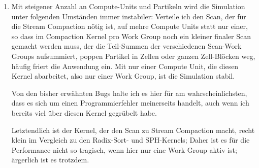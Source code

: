\begin{enumerate}
		\item 
		\label{enum:oclSyncBug}		
		Mit steigener Anzahl an Compute-Units und Partikeln wird die Simulation unter folgenden Umständen immer instabiler:
		Verteile ich den Scan, der für die Stream Compaction nötig ist, auf mehre Compute Units statt nur einer,
		so dass im Compaction Kernel pro Work Group noch ein kleiner finaler Scan gemacht werden muss,
		der die Teil-Summen der verschiedenen Scan-Work Groups aufsummiert, poppen Partikel
		in Zellen oder ganzen Zell-Blöcken weg, häufig friert die Anwendung ein.
		Mit nur einer Compute Unit, die diesen Kernel abarbeitet, also nur einer Work Group, ist die Simulation stabil.
		
		Von den bisher erwähnten Bugs halte ich es hier für am wahrscheinlichsten, dass es sich um einen Programmierfehler 
		meinerseits handelt, auch wenn ich bereits viel über diesen Kernel gegrübelt habe.
		
		Letztendlich ist der Kernel, der den Scan zu Stream Compaction macht, recht klein im Vergleich zu den
		Radix-Sort- und SPH-Kernels; Daher ist es für die Performance nicht so tragisch, wenn hier nur eine Work 
		Group aktiv ist; ärgerlich ist es trotzdem.
		\end{enumerate}

\clearpage

